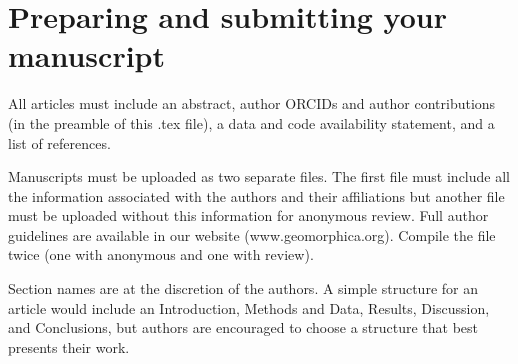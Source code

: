 \documentclass{article}
\begin{document}
%	                                
	
\section{Preparing and submitting your manuscript}
	
All articles must include an abstract, author ORCIDs and author contributions (in the preamble of this .tex file), a data and code availability statement, and a list of references. 

Manuscripts must be uploaded as two separate files. The first file must include all the information associated with the authors and their affiliations but another file must be uploaded without this information for anonymous review.  Full author guidelines are available in our website (www.geomorphica.org). Compile the file twice (one with anonymous and one with review). 
 
Section names are at the discretion of the authors. A simple structure for an article would include an Introduction, Methods and Data, Results, Discussion, and Conclusions, but authors are encouraged to choose a structure that best presents their work.
	
\end{document}
